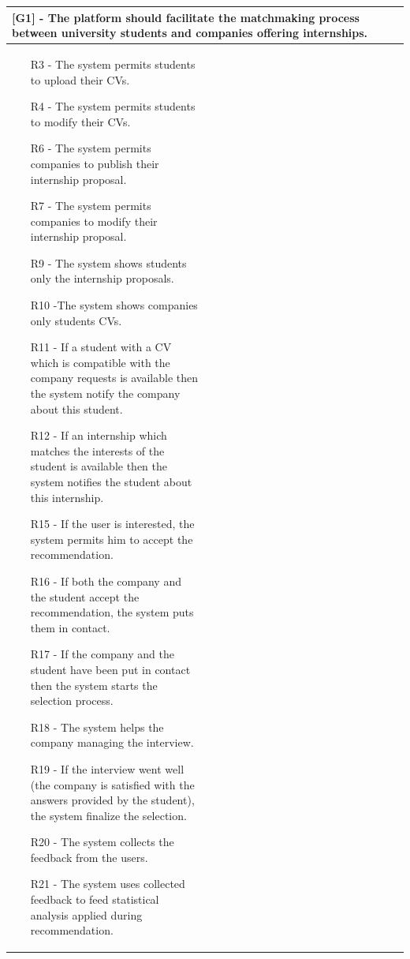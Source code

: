 \documentclass[12pt]{article}
\begin{document}
    \begin{center}
        \begin{longtable}{|p{0.5\linewidth}|p{0.5\linewidth}|}
            \hline
            \multicolumn{2}{|p{\linewidth}|}{\textbf{[G1] - The platform should facilitate the matchmaking process between university students and companies offering internships.}} \\
            \hline
                \begin{itemize}
                    \item [R3] - The system permits students to upload their CVs.
                    \item [R4] - The system permits students to modify their CVs.
                    \item [R6] - The system permits companies to publish their internship proposal.
                    \item [R7] - The system permits companies to modify their internship proposal.
                    \item [R9] - The system shows students only the internship proposals.
                    \item [R10] -The system shows companies only students CVs.
                    \item [R11] - If a student with a CV which is compatible with the company requests is available then the system notify the company about this student.
                    \item [R12] - If an internship which matches the interests of the student is available then the system notifies the student about this internship.
                    \item [R15] - If the user is interested, the system permits him to accept the recommendation.
                    \item [R16] - If both the company and the student accept the recommendation, the system puts them in contact.
                    \item [R17] - If the company and the student have been put in contact then the system starts the selection process.
                    \item [R18] - The system helps the company managing the interview.
                    \item [R19] - If the interview went well (the company is satisfied with the answers provided by the student), the system finalize the selection.
                    \item [R20] - The system collects the feedback from the users.
                    \item [R21] - The system uses collected feedback to feed statistical analysis applied during recommendation.
                \end{itemize}
             &  \\
            \hline
        \end{longtable}
    \end{center}
\end{document}
